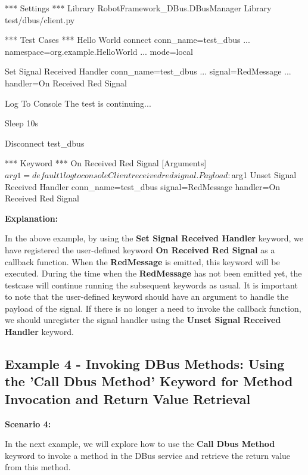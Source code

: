 \begin{robotcode}
*** Settings ***
Library    RobotFramework_DBus.DBusManager
Library    test/dbus/client.py

*** Test Cases ***
Hello World
   connect    conn_name=test_dbus
   ...        namespace=org.example.HelloWorld
   ...        mode=local

   Set Signal Received Handler    conn_name=test_dbus
   ...                            signal=RedMessage
   ...                            handler=On Received Red Signal

   Log To Console    The test is continuing...

   Sleep    10s

   Disconnect    test_dbus

*** Keyword ***
On Received Red Signal
   [Arguments]    ${arg1}=default 1
   log to console      Client received red signal. Payload: ${arg1}
   Unset Signal Received Handler    conn_name=test_dbus    signal=RedMessage    handler=On Received Red Signal
\end{robotcode}

\textbf{Explanation:}

In the above example, by using the \textbf{Set Signal Received Handler} keyword, we have registered the user-defined keyword \textbf{On Received Red Signal} as a callback function.
When the \textbf{RedMessage} is emitted, this keyword will be executed. During the time when the \textbf{RedMessage} has not been emitted yet, the testcase will continue running the
subsequent keywords as usual. It is important to note that the user-defined keyword should have an argument to handle the payload of the signal. If there is no longer a need to invoke
the callback function, we should unregister the signal handler using the \textbf{Unset Signal Received Handler} keyword.



\hypertarget{description-example4}{%
\subsection{\texorpdfstring{\textbf{Example 4 - Invoking DBus Methods: Using the 'Call Dbus Method' Keyword for Method Invocation and Return Value Retrieval}}{Example 4 - Invoking DBus Methods: Using the 'Call Dbus Method' Keyword for Method Invocation and Return Value Retrieval}}\label{description-example4}}

\textbf{Scenario 4:}

In the next example, we will explore how to use the \textbf{Call Dbus Method} keyword to invoke a method in the DBus service and retrieve the return value from this method.


